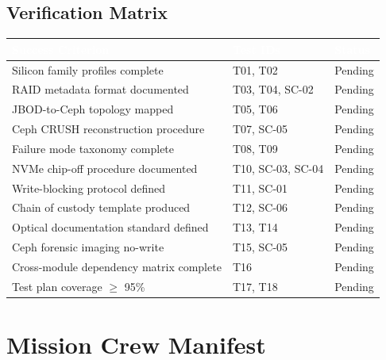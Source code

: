 \documentclass[11pt,letterpaper]{article}
\newcommand{\tableheader}[1]{\textbf{\sffamily\textcolor{white}{#1}}}
\begin{document}
\subsection{Verification Matrix}

\begin{center}
\begin{tabularx}{\textwidth}{L{4cm}C{2.5cm}C{2cm}}
\toprule
{}
\tableheader{Success Criterion} & \tableheader{Test IDs} & \tableheader{Status} \\
\midrule
Silicon family profiles complete & T01, T02 & Pending \\
RAID metadata format documented & T03, T04, SC-02 & Pending \\
JBOD-to-Ceph topology mapped & T05, T06 & Pending \\
Ceph CRUSH reconstruction procedure & T07, SC-05 & Pending \\
Failure mode taxonomy complete & T08, T09 & Pending \\
NVMe chip-off procedure documented & T10, SC-03, SC-04 & Pending \\
Write-blocking protocol defined & T11, SC-01 & Pending \\
Chain of custody template produced & T12, SC-06 & Pending \\
Optical documentation standard defined & T13, T14 & Pending \\
Ceph forensic imaging no-write & T15, SC-05 & Pending \\
Cross-module dependency matrix complete & T16 & Pending \\
Test plan coverage $\geq$ 95\% & T17, T18 & Pending \\
\bottomrule
\end{tabularx}
\end{center}

\section{Mission Crew Manifest}
\end{document}
